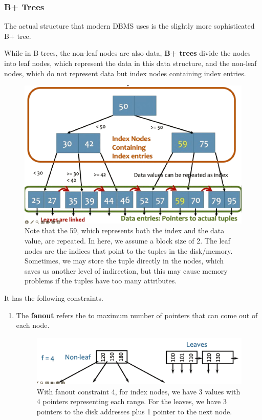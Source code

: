   \subsubsection{B+ Trees}

    The actual structure that modern DBMS uses is the slightly more sophisticated B+ tree. 

    \begin{definition}[B+ Tree]
      While in B trees, the non-leaf nodes are also data, \textbf{B+ trees} divide the nodes into leaf nodes, which represent the data in this data structure, and the non-leaf nodes, which do not represent data but index nodes containing index entries. 

      \begin{figure}[H]
        \centering 
        \includegraphics[scale=0.4]{img/bp_tree.png} 
        \caption{Note that the 59, which represents both the index and the data value, are repeated. In here, we assume a block size of 2. The leaf nodes are the indices that point to the tuples in the disk/memory. Sometimes, we may store the tuple directly in the nodes, which saves us another level of indirection, but this may cause memory problems if the tuples have too many attributes.} 
        \label{fig:bp_tree} 
      \end{figure}

      It has the following constraints. 
      \begin{enumerate}
        \item The \textbf{fanout} refers the to maximum number of pointers that can come out of each node. 
        \begin{figure}[H]
          \centering 
          \includegraphics[scale=0.3]{img/fanout.png}
          \caption{With fanout constraint 4, for index nodes, we have 3 values with 4 pointers representing each range. For the leaves, we have 3 pointers to the disk addresses plus 1 pointer to the next node. } 
          \label{fig:fanout}
        \end{figure}


\end{enumerate}
\end{definition}
